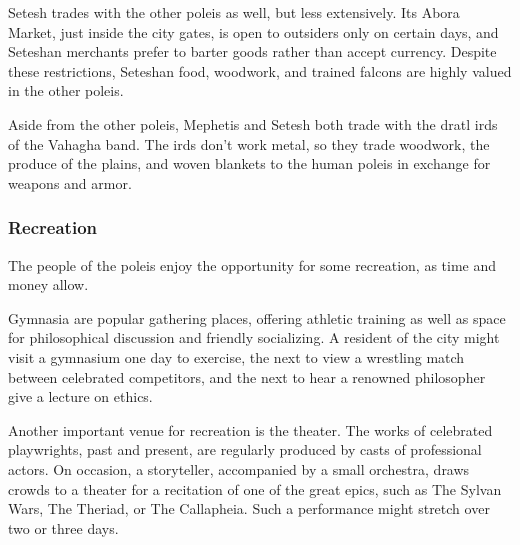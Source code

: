 Setesh trades with the other poleis as well, but less extensively.
Its Abora Market, just inside the city gates, is open to outsiders only on certain days, and Seteshan merchants prefer to barter goods rather than accept currency.
Despite these restrictions, Seteshan food, woodwork, and trained falcons are highly valued in the other poleis.

Aside from the other poleis, Mephetis and Setesh both trade with the dratl irds of the Vahagha band.
The irds don't work metal, so they trade woodwork, the produce of the plains, and woven blankets to the human poleis in exchange for weapons and armor.

\subsubsection{Recreation}
The people of the poleis enjoy the opportunity for some recreation, as time and money allow.

Gymnasia are popular gathering places, offering athletic training as well as space for philosophical discussion and friendly socializing.
A resident of the city might visit a gymnasium one day to exercise, the next to view a wrestling match between celebrated competitors, and the next to hear a renowned philosopher give a lecture on ethics.

Another important venue for recreation is the theater.
The works of celebrated playwrights, past and present, are regularly produced by casts of professional actors.
On occasion, a storyteller, accompanied by a small orchestra, draws crowds to a theater for a recitation of one of the great epics, such as The Sylvan Wars, The Theriad, or The Callapheia.
Such a performance might stretch over two or three days.
